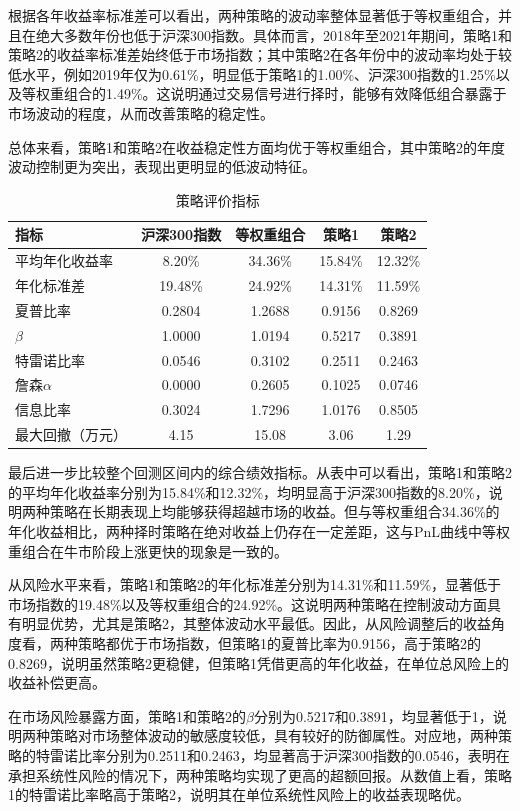 \documentclass[a4paper,12pt]{article}
\begin{document}
根据各年收益率标准差可以看出，两种策略的波动率整体显著低于等权重组合，并且在绝大多数年份也低于沪深300指数。具体而言，2018年至2021年期间，策略1和策略2的收益率标准差始终低于市场指数；其中策略2在各年份中的波动率均处于较低水平，例如2019年仅为0.61\%，明显低于策略1的1.00\%、沪深300指数的1.25\%以及等权重组合的1.49\%。这说明通过交易信号进行择时，能够有效降低组合暴露于市场波动的程度，从而改善策略的稳定性。

总体来看，策略1和策略2在收益稳定性方面均优于等权重组合，其中策略2的年度波动控制更为突出，表现出更明显的低波动特征。

\begin{table}[H]
\centering
\caption{策略评价指标}
\begin{tabular}{lcccc}
\toprule
指标 & 沪深300指数 & 等权重组合 & 策略1 & 策略2 \\
\midrule
平均年化收益率 & 8.20\% & 34.36\% & 15.84\% & 12.32\% \\
年化标准差 & 19.48\% & 24.92\% & 14.31\% & 11.59\% \\
夏普比率 & 0.2804 & 1.2688 & 0.9156 & 0.8269 \\
$\beta$ & 1.0000 & 1.0194 & 0.5217 & 0.3891 \\
特雷诺比率 & 0.0546 & 0.3102 & 0.2511 & 0.2463 \\
詹森$\alpha$ & 0.0000 & 0.2605 & 0.1025 & 0.0746 \\
信息比率 & 0.3024 & 1.7296 & 1.0176 & 0.8505 \\
最大回撤（万元） & 4.15 & 15.08 & 3.06 & 1.29 \\
\bottomrule
\end{tabular}
\end{table}

最后进一步比较整个回测区间内的综合绩效指标。从表中可以看出，策略1和策略2的平均年化收益率分别为15.84\%和12.32\%，均明显高于沪深300指数的8.20\%，说明两种策略在长期表现上均能够获得超越市场的收益。但与等权重组合34.36\%的年化收益相比，两种择时策略在绝对收益上仍存在一定差距，这与PnL曲线中等权重组合在牛市阶段上涨更快的现象是一致的。

从风险水平来看，策略1和策略2的年化标准差分别为14.31\%和11.59\%，显著低于市场指数的19.48\%以及等权重组合的24.92\%。这说明两种策略在控制波动方面具有明显优势，尤其是策略2，其整体波动水平最低。因此，从风险调整后的收益角度看，两种策略都优于市场指数，但策略1的夏普比率为0.9156，高于策略2的0.8269，说明虽然策略2更稳健，但策略1凭借更高的年化收益，在单位总风险上的收益补偿更高。

在市场风险暴露方面，策略1和策略2的$\beta$分别为0.5217和0.3891，均显著低于1，说明两种策略对市场整体波动的敏感度较低，具有较好的防御属性。对应地，两种策略的特雷诺比率分别为0.2511和0.2463，均显著高于沪深300指数的0.0546，表明在承担系统性风险的情况下，两种策略均实现了更高的超额回报。从数值上看，策略1的特雷诺比率略高于策略2，说明其在单位系统性风险上的收益表现略优。
\end{document}
